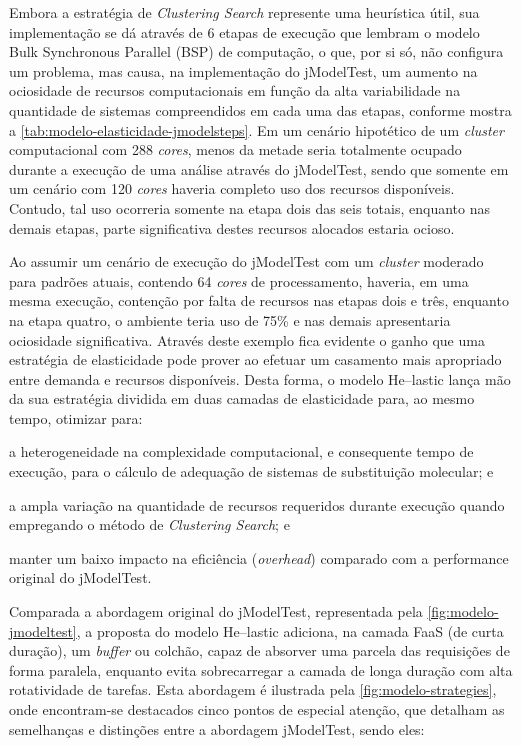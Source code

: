 \documentclass[english,brazilian]{UNISINOSmonografia} %
\begin{document}
Embora a estratégia de \textit{Clustering Search} represente uma heurística útil, sua implementação se dá através de 6 etapas de execução que lembram o modelo Bulk Synchronous Parallel (BSP) de computação, o que, por si só, não configura um problema, mas causa, na implementação do jModelTest, um aumento na ociosidade de recursos computacionais em função da alta variabilidade na quantidade de sistemas compreendidos em cada uma das etapas, conforme mostra a \autoref{tab:modelo-elasticidade-jmodelsteps}.
Em um cenário hipotético de um \textit{cluster} computacional com 288 \textit{cores}, menos da metade seria totalmente ocupado durante a execução de uma análise através do jModelTest, sendo que somente em um cenário com 120 \textit{cores} haveria completo uso dos recursos disponíveis.
Contudo, tal uso ocorreria somente na etapa dois das seis totais, enquanto nas demais etapas, parte significativa destes recursos alocados estaria ocioso.



Ao assumir um cenário de execução do jModelTest com um \textit{cluster} moderado para padrões atuais, contendo 64 \textit{cores} de processamento, haveria, em uma mesma execução, contenção por falta de recursos nas etapas dois e três, enquanto na etapa quatro, o ambiente teria uso de 75\% e nas demais apresentaria ociosidade significativa.
Através deste exemplo fica evidente o ganho que uma estratégia de elasticidade pode prover ao efetuar um casamento mais apropriado entre demanda e recursos disponíveis.
Desta forma, o modelo \textsf{He}--lastic lança mão da sua estratégia dividida em duas camadas de elasticidade para, ao mesmo tempo, otimizar para:
\begin{inparaenum} 
	\item a heterogeneidade na complexidade computacional, e consequente tempo de execução, para o cálculo de adequação de sistemas de substituição molecular; e
	\item a ampla variação na quantidade de recursos requeridos durante execução quando empregando o método de \textit{Clustering Search}; e
	\item manter um baixo impacto na eficiência (\textit{overhead}) comparado com a performance original do jModelTest. 
\end{inparaenum}


Comparada a abordagem original do jModelTest, representada pela \autoref{fig:modelo-jmodeltest}, a proposta do modelo \textsf{He}--lastic adiciona, na camada FaaS (de curta duração), um \textit{buffer} ou colchão, capaz de absorver uma parcela das requisições de forma paralela, enquanto evita sobrecarregar a camada de longa duração com alta rotatividade de tarefas.
Esta abordagem é ilustrada pela \autoref{fig:modelo-strategies}, onde encontram-se destacados cinco pontos de especial atenção, que detalham as semelhanças e distinções entre a abordagem jModelTest, sendo eles:
\end{document}
